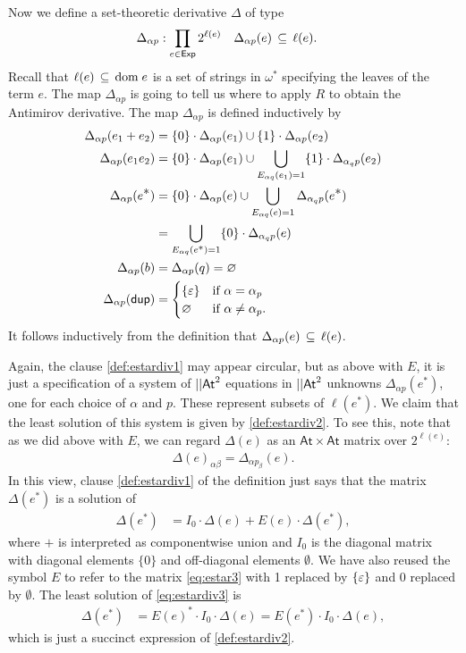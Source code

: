 \documentclass{article}
\newcommand\At{\ensuremath{\mathsf{At}}}
\newcommand\pdup{\mathop{\mathsf{dup}}}
\newcommand\Exp{\mathsf{Exp}}
\renewcommand\star{^{\textstyle *}}
\renewcommand\powerset[1]{2^{#1}}
\newcommand\repname{R}
\newcommand\STD{\Delta}
\newcommand\STDM{\Delta}
\begin{document}
Now we define a set-theoretic derivative $\STD$ of type
\begin{align*}
\STD_{\alpha p} &: \prod_{e\in\Exp}2^{\ell(e)} & \STD_{\alpha p}(e) &\subs \ell(e).
\end{align*}
Recall that $\ell(e)\,\subseteq\,{\rm dom\;}e$ is a set of strings in $\omega\star$ specifying the leaves of the term $e$.
The map $\STD_{\alpha p}$ is going to tell us where to apply $\repname$ to obtain the Antimirov derivative.
The map $\STD_{\alpha p}$ is defined inductively by
\begin{align}
\STD_{\alpha p}(e_1+e_2) &= \{0\}\cdot\STD_{\alpha p}(e_1) \cup \{1\}\cdot\STD_{\alpha p}(e_2)\nonumber\\
\STD_{\alpha p}(e_1e_2) &= \{0\}\cdot\STD_{\alpha p}(e_1) \cup \bigcup_{E_{\alpha q}(e_1)=1} \{1\}\cdot\STD_{\alpha_qp}(e_2)\nonumber\\
\STD_{\alpha p}(e\star) &= \{0\}\cdot\STD_{\alpha p}(e) \cup \bigcup_{E_{\alpha q}(e)=1}\STD_{\alpha_qp}(e\star)\label{def:estardiv1}\\
&= \bigcup_{E_{\alpha q}(e^{\scriptstyle *})=1} \{0\}\cdot\STD_{\alpha_qp}(e)\label{def:estardiv2}\\
\STD_{\alpha p}(b) &= \STD_{\alpha p}(q) = \emptyset\nonumber\\
\STD_{\alpha p}(\pdup) &= \begin{cases}
\{\eps\} & \text{if $\alpha=\alpha_p$}\\
\emptyset & \text{if $\alpha\neq\alpha_p$.}\nonumber
\end{cases}
\end{align}
It follows inductively from the definition that $\STD_{\alpha p}(e) \subs \ell(e)$.

Again, the clause \eqref{def:estardiv1} may appear circular, but as above with $E$, it is just a specification of a system of $\len\At^2$ equations in $\len\At^2$ unknowns $\STD_{\alpha p}(e\star)$, one for each choice of $\alpha$ and $p$. These represent subsets of $\ell(e\star)$. We claim that the least solution of this system is given by \eqref{def:estardiv2}. To see this, note that as we did above with $E$, we can regard $\STDM(e)$ as an $\At\times\At$ matrix over $\powerset{\ell(e)}$:
\begin{gather*}
\STDM(e)_{\alpha\beta} = \STD_{\alpha p_\beta}(e).
\end{gather*}
In this view, clause \eqref{def:estardiv1} of the definition just says that the matrix $\STDM(e\star)$ is a solution of
\begin{align}
\STDM(e\star) &= I_0\cdot\STDM(e) + E(e)\cdot\STDM(e\star),\label{eq:estardiv3}
\end{align}
where $+$ is interpreted as componentwise union and $I_0$ is the diagonal matrix with diagonal elements $\{0\}$ and off-diagonal elements $\emptyset$. We have also reused the symbol $E$ to refer to the matrix \eqref{eq:estar3} with 1 replaced by $\{\varepsilon\}$ and $0$ replaced by $\emptyset$. The least solution of \eqref{eq:estardiv3} is 
\begin{align*}
\STDM(e\star) &= E(e)\star\cdot I_0\cdot\STDM(e) = E(e\star)\cdot I_0\cdot\STDM(e),
\end{align*}
which is just a succinct expression of \eqref{def:estardiv2}.
\end{document}
